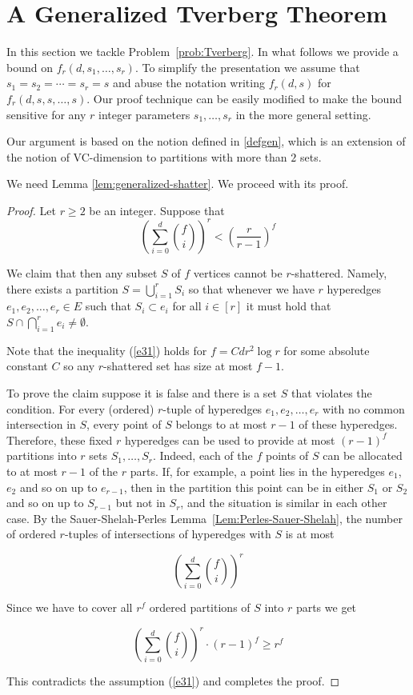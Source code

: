 \documentclass[11pt]{article}
\theoremstyle{plain}
\theoremstyle{definition}
\theoremstyle{remark}
\begin{document}
\section{A Generalized Tverberg Theorem}
\label{sec:Generalized Tverberg}
In this section we tackle Problem~\ref{prob:Tverberg}.  In what follows we
provide a bound on $f_r(d,s_1,\ldots,s_r)$. To simplify the presentation
we assume that $s_1=s_2=\cdots=s_r=s$ and abuse the
notation writing $f_r(d,s)$ for $f_r(d,s,s,\ldots ,s)$. Our
proof technique can be easily modified to make the bound sensitive 
for any $r$
integer parameters $s_1,\ldots,s_r$ in the more general setting.

Our argument is based on the notion defined in  \ref{defgen}, which is an extension of the notion of 
VC-dimension to
partitions with more than $2$ sets.

We need Lemma 
\ref{lem:generalized-shatter}. We proceed with its proof. 

\begin{proof}
Let $r\geq 2$ be an integer. 
Suppose that
\begin{equation}
    \label{e31}
   \left (\sum_{i=0}^d {f \choose i}\right  )^r < \left (\frac{r}{r-1}\right )^f
   \end{equation}

We claim that then
any subset $S$ of $f$ vertices cannot be $r$-shattered. Namely, there
exists a partition $S=\bigcup_{i=1}^r S_i$ so that whenever we have $r$
hyperedges $e_1, e_2,\ldots,e_r \in E$ such that $S_i \subset e_i$ for all
$i \in [r]$ it must hold that $S \cap \bigcap_{i=1}^r e_i \neq \emptyset$.

Note that the inequality (\ref{e31}) holds 
for $f = Cdr^2 \log r$ for some absolute constant $C$ so any $r$-shattered set has size at most $f-1$.

To prove the claim suppose it is
false and there is a set $S$ that violates the condition.
For every (ordered) $r$-tuple  of hyperedges $e_1,e_2,\ldots,e_r$
with no common intersection in $S$, every point of $S$ belongs to at
most $r-1$ of these hyperedges. Therefore, these fixed $r$ hyperedges
can be used to provide at most $(r-1)^f$ partitions into $r$ sets
$S_1,\ldots,S_r$. Indeed, each of the $f$ points of $S$
can be allocated to 
at most $r-1$ of the $r$ parts.
If, for example, a point lies in the hyperedges $e_1$, $e_2$
and so on
up to $e_{r-1}$, then in the partition this point can be in 
either $S_1$ or $S_2$ and so on
up to $S_{r-1}$ but not in $S_r$, and the situation
	is similar in each other case.
By the Sauer-Shelah-Perles Lemma~\ref{Lem:Perles-Sauer-Shelah},  
	the number of ordered
$r$-tuples of intersections of hyperedges with $S$ is at most

$$\left(\sum_{i=0}^d {f \choose i} \right)^r$$

Since we have to cover all $r^f$ ordered 
partitions of $S$ into $r$ parts we get

$$\left (\sum_{i=0}^d {f \choose i}\right)^r  \cdot (r-1)^f \geq r^f$$

This contradicts the assumption (\ref{e31})  and completes the proof. 
\end{proof}
\end{document}
